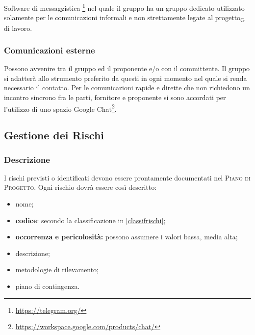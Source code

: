             Software di messaggistica \footnote{\url{https://telegram.org/}} nel quale il gruppo \group ha un gruppo dedicato utilizzato solamente per le comunicazioni informali e non strettamente legate al progetto\textsubscript{G} di lavoro.
    \subsubsection{Comunicazioni esterne}
        Possono avvenire tra il gruppo \group ed il proponente e/o con il committente. Il gruppo si adatterà allo strumento preferito da questi in ogni momento nel quale si renda necessario il contatto. Per le comunicazioni rapide e dirette che non richiedono un incontro sincrono fra le parti, fornitore e proponente si sono accordati per l'utilizzo di uno spazio Google Chat\footnote{\url{https://workspace.google.com/products/chat/}}.

\subsection{Gestione dei Rischi}
    \subsubsection{Descrizione}
        I rischi previsti o identificati devono essere prontamente documentati nel \textsc{Piano di Progetto}. Ogni rischio dovrà essere così descritto:
        \begin{itemize}
            \item nome;
            \item \textbf{codice}: secondo la classificazione in \ref{classifrischi};
            \item \textbf{occorrenza e pericolosità: }possono assumere i valori bassa, media alta;
            \item descrizione;
            \item metodologie di rilevamento;
            \item piano di contingenza.
        \end{itemize}
